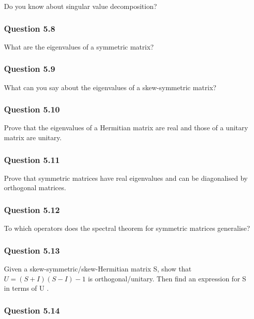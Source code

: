 Do you know about singular value decomposition?

\hypertarget{question-5.8}{%
\subsubsection{Question 5.8}\label{question-5.8}}

What are the eigenvalues of a symmetric matrix?

\hypertarget{question-5.9}{%
\subsubsection{Question 5.9}\label{question-5.9}}

What can you say about the eigenvalues of a skew-symmetric matrix?

\hypertarget{question-5.10}{%
\subsubsection{Question 5.10}\label{question-5.10}}

Prove that the eigenvalues of a Hermitian matrix are real and those of a
unitary matrix are unitary.

\hypertarget{question-5.11}{%
\subsubsection{Question 5.11}\label{question-5.11}}

Prove that symmetric matrices have real eigenvalues and can be
diagonalised by orthogonal matrices.

\hypertarget{question-5.12}{%
\subsubsection{Question 5.12}\label{question-5.12}}

To which operators does the spectral theorem for symmetric matrices
generalise?

\hypertarget{question-5.13}{%
\subsubsection{Question 5.13}\label{question-5.13}}

Given a skew-symmetric/skew-Hermitian matrix S, show that
\(U = (S + I)(S - I)-1\) is orthogonal/unitary. Then find an expression
for S in terms of U .

\hypertarget{question-5.14}{%
\subsubsection{Question 5.14}\label{question-5.14}}

